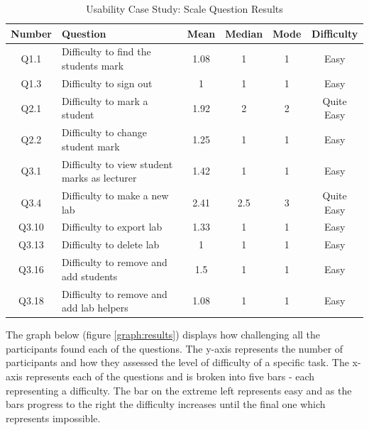 \documentclass[11pt]{report}
\begin{document}
\begin{spacing}{1.2}
\begin{longtable}{@{\extracolsep{\fill}}|c|l|c|c|c|c|}
\caption{Usability Case Study: Scale Question Results} \label{table:usability} \\ \hline

\textbf{Number} & \textbf{Question} & \textbf{Mean} & \textbf{Median} & \textbf{Mode} & \textbf{Difficulty}\\ \hline

Q1.1 & Difficulty to find the students mark & 1.08 & 1 & 1 & Easy\\ \hline
Q1.3 & Difficulty to sign out & 1 & 1 & 1 & Easy \\ \hline

Q2.1 & Difficulty to mark a student & 1.92 & 2 & 2 & Quite Easy \\ \hline
Q2.2 & Difficulty to change student mark & 1.25 & 1 & 1 &  Easy \\ \hline

Q3.1 & Difficulty to view student marks as lecturer & 1.42 & 1 & 1 &  Easy \\ \hline
Q3.4 & Difficulty to make a new lab & 2.41 & 2.5 & 3 & Quite Easy \\ \hline
Q3.10 & Difficulty to export lab & 1.33 & 1 & 1 &  Easy \\ \hline
Q3.13 & Difficulty to delete lab & 1 & 1 & 1 &  Easy \\ \hline
Q3.16 & Difficulty to remove and add students & 1.5 & 1 & 1 &  Easy \\ \hline
Q3.18 & Difficulty to remove and add lab helpers & 1.08 & 1 & 1 & Easy \\ \hline

\end{longtable}
\end{spacing}

\noindent The graph below (figure \ref{graph:results}) displays how challenging all the participants found each of the questions. The y-axis represents the number of participants and how they assessed the level of difficulty of a specific task. The x-axis represents each of the questions and is broken  into five bars - each representing a difficulty. The bar on the extreme left  represents easy and as the bars progress to the right the difficulty increases until the final one which represents impossible.  
\end{document}
